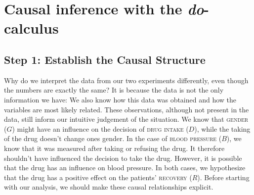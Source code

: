 \documentclass[nobib]{tufte-handout}
\newcommand{\docalc}{\emph{do}-calculus\xspace}
\begin{document}
\section{Causal inference with the \docalc} \label{sec:theory}
\subsection{Step 1: Establish the Causal Structure} \label{sec:step1}


Why do we interpret the data from our two experiments differently, even though the numbers are exactly the same?
It is because the data is not the only information we have: We also know how this data was obtained and how the variables are most likely related. 
These observations, although not present in the data, still inform our intuitive judgement of the situation.
We know that \textsc{gender} ($G$) might have an influence on the decision of \textsc{drug intake} ($D$), while the taking of the drug doesn't change ones gender.
In the case of \textsc{blood pressure} ($B$), we know that it was measured after taking or refusing the drug. 
It therefore shouldn't have influenced the decision to take the drug. 
However, it is possible that the drug has an influence on blood pressure.
In both cases, we hypothesize that the drug has a positive effect on the patients' \textsc{recovery} ($R$).
Before starting with our analysis, we should make these causal relationships explicit.
\end{document}
